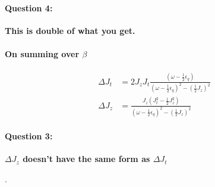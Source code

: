\documentclass[14pt]{extarticle}
\newcommand{\qs}[1]{\textbf{{\textcolor{botgreen}{#1}}}}
\numberwithin{equation}{section}
\begin{document}
\paragraph{Question 4:}\qs{This is double of what you get.}
\paragraph{On summing over $\beta$}
\begin{align}
  \Delta J_t  &= 2 J_zJ_t \frac{\left( \omega - \frac{1}{2}\epsilon_q \right)}{\left( \omega - \frac{1}{2}\epsilon_q \right)^2 - \left( \frac{1}{2} J_z \right)^2}   \label{eq:21} \\
\Delta J_z  &= \frac{J_z \left( J_t^2 - \frac{1}{2} J_z^2 \right)}{\left( \omega - \frac{1}{2}\epsilon_q \right)^2 - \left( \frac{1}{2} J_z \right)^2}
\end{align}
\paragraph{Question 3:}\hypertarget{qs3}{\qs{$\Delta J_z$ doesn't have the same form as $\Delta J_t$}}.

\end{document}
